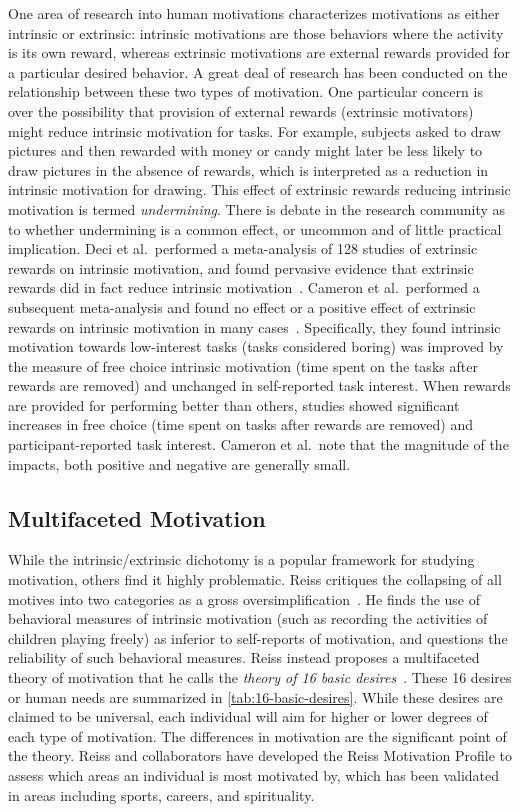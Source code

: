 One area of research into human motivations characterizes motivations as either intrinsic or extrinsic: intrinsic motivations are those behaviors where the activity is its own reward, whereas extrinsic motivations are external rewards provided for a particular desired behavior. A great deal of research has been conducted on the relationship between these two types of motivation. One particular concern is over the possibility that provision of external rewards (extrinsic motivators) might reduce intrinsic motivation for tasks. For example, subjects asked to draw pictures and then rewarded with money or candy might later be less likely to draw pictures in the absence of rewards, which is interpreted as a reduction in intrinsic motivation for drawing. This effect of extrinsic rewards reducing intrinsic motivation is termed \emph{undermining}. There is debate in the research community as to whether undermining is a common effect, or uncommon and of little practical implication. Deci et al.\ performed a meta-analysis of 128 studies of extrinsic rewards on intrinsic motivation, and found pervasive evidence that extrinsic rewards did in fact reduce intrinsic motivation~\cite{Deci1999}. Cameron et al.\ performed a subsequent meta-analysis and found no effect or a positive effect of extrinsic rewards on intrinsic motivation in many cases~\cite{Cameron2001}. Specifically, they found intrinsic motivation towards low-interest tasks (tasks considered boring) was improved by the measure of free choice intrinsic motivation (time spent on the tasks after rewards are removed) and unchanged in self-reported task interest. When rewards are provided for performing better than others, studies showed significant increases in free choice (time spent on tasks after rewards are removed) and participant-reported task interest. Cameron et al.\ note that the magnitude of the impacts, both positive and negative are generally small.


\subsection{Multifaceted Motivation}

While the intrinsic/extrinsic dichotomy is a popular framework for studying motivation, others find it highly problematic. Reiss critiques the collapsing of all motives into two categories as a gross oversimplification~\cite{Reiss2012}. He finds the use of behavioral measures of intrinsic motivation (such as recording the activities of children playing freely) as inferior to self-reports of motivation, and questions the reliability of such behavioral measures. Reiss instead proposes a multifaceted theory of motivation that he calls the \emph{theory of 16 basic desires}~\cite{Reiss2004}. These 16 desires or human needs are summarized in \autoref{tab:16-basic-desires}. While these desires are claimed to be universal, each individual will aim for higher or lower degrees of each type of motivation. The differences in motivation are the significant point of the theory. Reiss and collaborators have developed the Reiss Motivation Profile to assess which areas an individual is most motivated by, which has been validated in areas including sports, careers, and spirituality.


